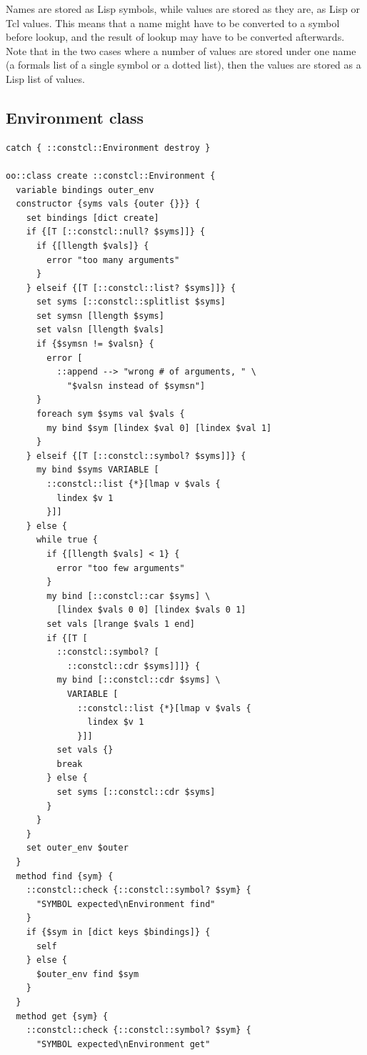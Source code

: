 \documentclass[twoside,9pt]{report}
\begin{document}
Names are stored as Lisp symbols, while values are stored as they are, as Lisp or Tcl values. This means that a name might have to be converted to a symbol before lookup, and the result of lookup may have to be converted afterwards. Note that in the two cases where a number of values are stored under one name (a formals list of a single symbol or a dotted list), then the values are stored as a Lisp list of values.

\subsection{Environment class}
\label{environment-class}
\begin{lstlisting}
catch { ::constcl::Environment destroy }

oo::class create ::constcl::Environment {
  variable bindings outer_env
  constructor {syms vals {outer {}}} {
    set bindings [dict create]
    if {[T [::constcl::null? $syms]]} {
      if {[llength $vals]} {
        error "too many arguments"
      }
    } elseif {[T [::constcl::list? $syms]]} {
      set syms [::constcl::splitlist $syms]
      set symsn [llength $syms]
      set valsn [llength $vals]
      if {$symsn != $valsn} {
        error [
          ::append --> "wrong # of arguments, " \
            "$valsn instead of $symsn"]
      }
      foreach sym $syms val $vals {
        my bind $sym [lindex $val 0] [lindex $val 1]
      }
    } elseif {[T [::constcl::symbol? $syms]]} {
      my bind $syms VARIABLE [
        ::constcl::list {*}[lmap v $vals {
          lindex $v 1
        }]]
    } else {
      while true {
        if {[llength $vals] < 1} {
          error "too few arguments"
        }
        my bind [::constcl::car $syms] \
          [lindex $vals 0 0] [lindex $vals 0 1]
        set vals [lrange $vals 1 end]
        if {[T [
          ::constcl::symbol? [
            ::constcl::cdr $syms]]]} {
          my bind [::constcl::cdr $syms] \
            VARIABLE [
              ::constcl::list {*}[lmap v $vals {
                lindex $v 1
              }]]
          set vals {}
          break
        } else {
          set syms [::constcl::cdr $syms]
        }
      }
    }
    set outer_env $outer
  }
  method find {sym} {
    ::constcl::check {::constcl::symbol? $sym} {
      "SYMBOL expected\nEnvironment find"
    }
    if {$sym in [dict keys $bindings]} {
      self
    } else {
      $outer_env find $sym
    }
  }
  method get {sym} {
    ::constcl::check {::constcl::symbol? $sym} {
      "SYMBOL expected\nEnvironment get"

\end{lstlisting}
\end{document}
